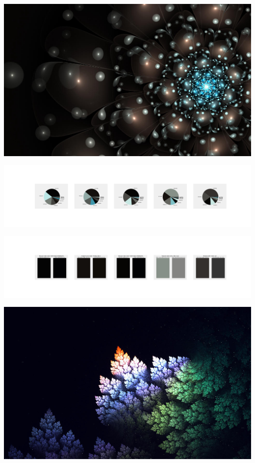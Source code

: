 \documentclass[11pt]{article}
\begin{document}
\begin{landscape}
    \begin{center}
    \includegraphics[width=\textwidth]{./nbimg/file (64).jpg}
    \end{center}

    \begin{center}
    \includegraphics[width=250mm]{./nbimg/pie-412.jpg}
    \end{center}

    \begin{center}
    \includegraphics[width=250mm]{./nbimg/peak-412.jpg}
    \end{center}
    

    \begin{center}
    \includegraphics[width=\textwidth]{./nbimg/file (65).jpg}
    \end{center}


\end{landscape}
\end{document}
